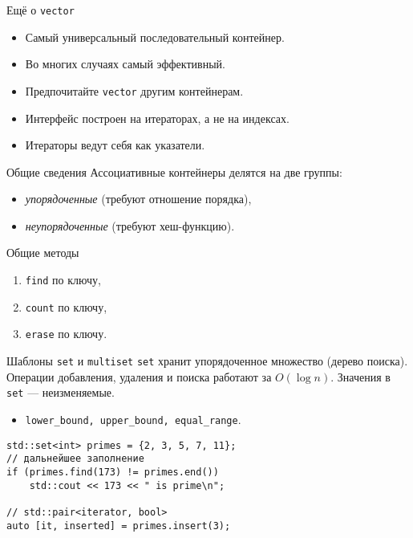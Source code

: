 \documentclass{beamer}
\begin{document}
\begin{frame}[fragile]{Ещё о {\tt vector}}
\small\setlength{\baselineskip}{0.6em}
 \begin{itemize}
     \item Самый универсальный последовательный контейнер. 

     \item Во многих случаях самый эффективный.
         
     \item Предпочитайте \texttt{vector} другим контейнерам.
 
     \item Интерфейс построен на итераторах, а не на индексах.
 
     \item Итераторы ведут себя как указатели.
\end{itemize}

\medskip

\end{frame}

\begin{frame}[fragile]{Общие сведения}
Ассоциативные контейнеры делятся на две группы:
\begin{itemize}
\item \textit{упорядоченные} (требуют отношение порядка), 
\item \textit{неупорядоченные} (требуют хеш-функцию).
\end{itemize}
\begin{block}{Общие методы}
\begin{enumerate}
    \item {\tt find} по ключу,
    \item {\tt count} по ключу,
    \item {\tt erase} по ключу.
\end{enumerate}
\end{block}
\end{frame}

\begin{frame}[fragile]{Шаблоны {\tt set} и {\tt multiset}}
\texttt{set} хранит упорядоченное множество (дерево поиска).\\ 
Операции добавления, удаления и поиска работают за $O(\log n)$.
Значения в \texttt{set} — неизменяемые.
\begin{itemize}
    \item {\tt lower\_bound, upper\_bound, equal\_range}.
\end{itemize}

\begin{lstlisting}
std::set<int> primes = {2, 3, 5, 7, 11};
// дальнейшее заполнение
if (primes.find(173) != primes.end())
    std::cout << 173 << " is prime\n";
    
// std::pair<iterator, bool>
auto [it, inserted] = primes.insert(3);
\end{lstlisting}
\end{frame}
\end{document}
